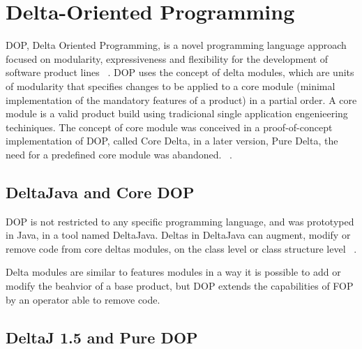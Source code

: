 \section{Delta-Oriented Programming}


DOP, Delta Oriented Programming, is a novel programming language approach focused on  modularity, expressiveness and flexibility for the development of software product lines ~\cite{}. DOP uses the concept of delta modules, which are units of modularity that specifies changes to be applied to a core module (minimal implementation of the mandatory features of a product) in a partial order.
A core module is a valid product build using tradicional single application engenieering techiniques. The concept of core module was conceived in a proof-of-concept implementation of DOP, called Core Delta, in a later version, Pure Delta,  the need for a predefined core module was abandoned. ~\cite{}.

\subsection{DeltaJava and Core DOP}
DOP is not restricted to any specific programming language, and was prototyped in Java, in a tool named DeltaJava. Deltas in DeltaJava can augment, modify or remove code from core deltas modules, on the class level or class structure level ~\cite{}. 

Delta modules are similar to features modules in a way it is possible to add or modify the beahvior of a base product, but DOP extends the capabilities of FOP by an operator able to remove code. 


\subsection{DeltaJ 1.5 and Pure DOP}



